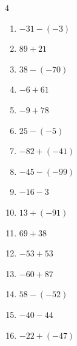 \begin{multicols}{4}
\begin{enumerate}
        \phantom{$=-118$}

  \item $-31-(-3)$

        \phantom{$=-28$}

  \item $89+21$

        \phantom{$=110$}

  \item $38-(-70)$

        \phantom{$=108$}

  \item $-6+61$

        \phantom{$=55$}

  \item $-9+78$

        \phantom{$=69$}

\columnbreak %

  \item $25-(-5)$

        \phantom{$=30$}

  \item $-82+(-41)$

        \phantom{$=-123$}

  \item $-45-(-99)$

        \phantom{$=54$}

  \item $-16-3$

        \phantom{$=-19$}

  \item $13+(-91)$

        \phantom{$=-78$}

  \item $69+38$

        \phantom{$=107$}

  \item $-53+53$

        \phantom{$=0$}

  \item $-60+87$

        \phantom{$=27$}

  \item $58-(-52)$

        \phantom{$=110$}

  \item $-40-44$

        \phantom{$=-84$}

  \item $-22+(-47)$


\end{enumerate}
\end{multicols}

